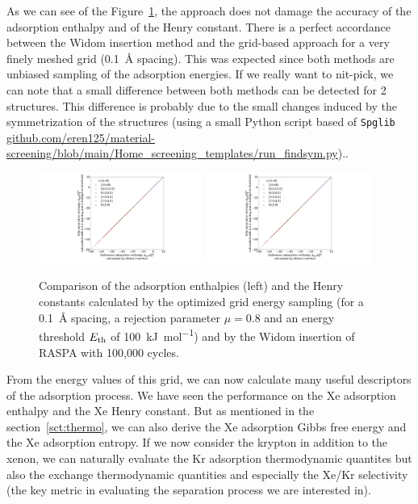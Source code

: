 \documentclass[main]{subfiles}
\begin{document}
As we can see of the Figure~\ref{fgr:grid_widom}, the approach does not damage the accuracy of the adsorption enthalpy and of the Henry constant. There is a perfect accordance between the Widom insertion method and the grid-based approach for a very finely meshed grid (\SI{0.1}{\angstrom} spacing). This was expected since both methods are unbiased sampling of the adsorption energies. If we really want to nit-pick, we can note that a small difference between both methods can be detected for 2 structures. This difference is probably due to the small changes induced by the symmetrization of the structures (using a small Python script based of \texttt{Spglib} \url{github.com/eren125/material-screening/blob/main/Home_screening_templates/run_findsym.py})..

\begin{figure}[ht]
  \centering
    \includegraphics[width=0.48\textwidth]{figures/3-fastsim/H_Xe_widom_vs_H_Xe_grid_overview.jpg}
    \includegraphics[width=0.48\textwidth]{figures/3-fastsim/H_Xe_widom_vs_H_Xe_grid_overview.jpg}
    \caption{Comparison of the adsorption enthalpies (left) and the Henry constants calculated by the optimized grid energy sampling (for a \SI{0.1}{\angstrom} spacing, a rejection parameter $\mu=0.8$ and an energy threshold $E_{\text{th}}$ of \SI{100}{\kilo\joule\per\mole}) and by the Widom insertion of RASPA with 100,000 cycles. }\label{fgr:grid_widom}
\end{figure}

From the energy values of this grid, we can now calculate many useful descriptors of the adsorption process. We have seen the performance on the Xe adsorption enthalpy and the Xe Henry constant. But as mentioned in the section~\ref{sct:thermo}, we can also derive the Xe adsorption Gibbs free energy and the Xe adsorption entropy. If we now consider the krypton in addition to the xenon, we can naturally evaluate the Kr adsorption thermodynamic quantites but also the exchange thermodynamic quantities and especially the Xe/Kr selectivity (the key metric in evaluating the separation process we are interested in).
\end{document}
